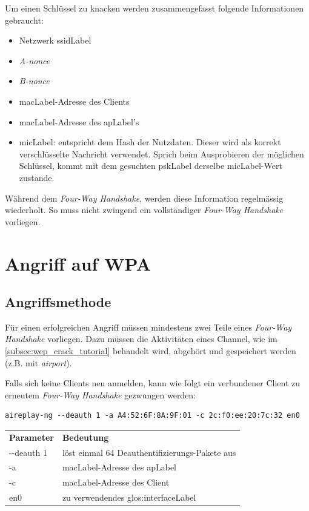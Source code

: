 
Um einen Schlüssel zu knacken werden zusammengefasst folgende Informationen gebraucht:
\begin{itemize}
	\item Netzwerk \gls{ssidLabel}
	\item \textit{A-nonce}
	\item \textit{B-nonce}
	\item \gls{macLabel}-Adresse des Clients
	\item \gls{macLabel}-Adresse des \gls{apLabel}'s
	\item \gls{micLabel}: entspricht dem Hash der Nutzdaten. Dieser wird als korrekt verschlüsselte Nachricht verwendet. Sprich beim Ausprobieren der möglichen Schlüssel, kommt mit dem gesuchten \gls{pskLabel} derselbe \gls{micLabel}-Wert zustande.
\end{itemize}

Während dem \textit{Four-Way Handshake}, werden diese Information regelmässig wiederholt.
So muss nicht zwingend ein vollständiger \textit{Four-Way Handshake} vorliegen.


\section{Angriff auf WPA}

\subsection{Angriffsmethode}
Für einen erfolgreichen Angriff müssen mindestens zwei Teile eines \textit{Four-Way Handshake} vorliegen.
Dazu müssen die Aktivitäten eines Channel, wie im \cref{subsec:wep_crack_tutorial} behandelt wird, abgehört und gespeichert werden (z.B. mit \textit{airport}).

Falls sich keine Clients neu anmelden, kann wie folgt ein verbundener Client zu erneutem \textit{Four-Way Handshake} gezwungen werden:
\begin{lstlisting}[style=lstStyleFramed]
aireplay-ng --deauth 1 -a A4:52:6F:8A:9F:01 -c 2c:f0:ee:20:7c:32 en0
\end{lstlisting}
\begin{tabular}{l l}
	\textbf{Parameter} & \textbf{Bedeutung}\\
	-{}-deauth 1 & löst einmal 64 Deauthentifizierungs-Pakete aus\\
	-a	& \gls{macLabel}-Adresse des \gls{apLabel}\\
	-c	& \gls{macLabel}-Adresse des Client\\
	en0 & zu verwendendes \gls{glos:interfaceLabel}
\end{tabular}

